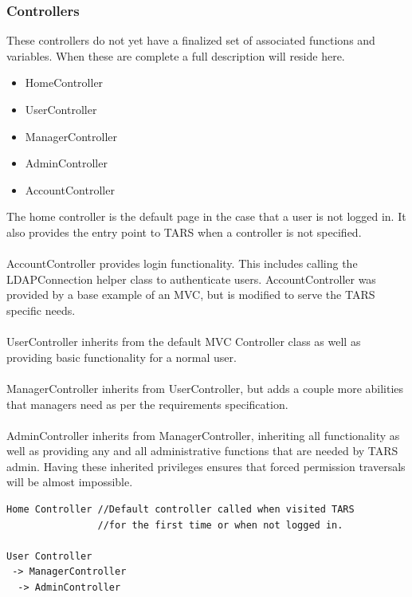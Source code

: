 \documentclass[letterpaper]{article}
\begin{document}
\subsubsection{Controllers}
These controllers do not yet have a finalized set of associated functions and variables. When these are complete a full description will reside here.
\begin{itemize}
\item HomeController
\item UserController
\item ManagerController
\item AdminController
\item AccountController
\end{itemize}
The home controller is the default page in the case that a user is not logged in. It also provides the entry point to TARS when a controller is not specified. \\
\\
AccountController provides login functionality. This includes calling the LDAPConnection helper class to authenticate users. AccountController was provided by a base example of an MVC, but is modified to serve the TARS specific needs.\\
\\
UserController inherits from the default MVC Controller class as well as providing basic functionality for a normal user.\\
\\
ManagerController inherits from UserController, but adds a couple more abilities that managers need as per the requirements specification.\\
\\
AdminController inherits from ManagerController, inheriting all functionality as well as providing any and all administrative functions that are needed by TARS admin. Having these inherited privileges ensures that forced permission traversals will be almost impossible.\\ 
\begin{verbatim}
Home Controller //Default controller called when visited TARS 
                //for the first time or when not logged in.

User Controller
 -> ManagerController
  -> AdminController

\end{verbatim}
\end{document}
